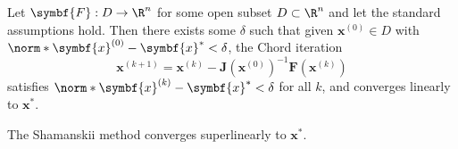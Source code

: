 \documentclass{article}
\begin{document}
\begin{theorem}
    Let \(\symbf{F} : D \to \R^n\) for some open subset \(D \subset \R^n\)
    and let the standard assumptions hold. Then there exists some \(\delta\)
    such that given \(\symbf{x}^{\left( 0 \right)} \in D\) with
    \(\norm*{\symbf{x}^{\left( 0 \right)} - \symbf{x}^\ast} < \delta\),
    the Chord iteration
    \begin{equation*}
        \symbf{x}^{\left( k + 1 \right)} = \symbf{x}^{\left( k \right)} - \symbf{J}\left( \symbf{x}^{\left( 0 \right)} \right)^{-1} \symbf{F}\left( \symbf{x}^{\left( k \right)} \right)
    \end{equation*}
    satisfies \(\norm*{\symbf{x}^{\left( k \right)} - \symbf{x}^\ast} < \delta\)
    for all \(k\), and converges linearly to \(\symbf{x}^\ast\).
\end{theorem}
\begin{corollary}
    The Shamanskii method converges superlinearly to \(\symbf{x}^\ast\).
\end{corollary}
\end{document}
